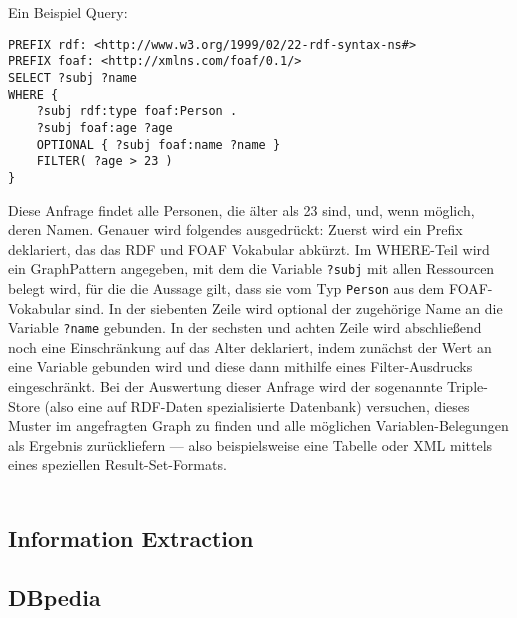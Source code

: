 Ein Beispiel Query:
\begin{lstlisting}[style=sparql]
PREFIX rdf: <http://www.w3.org/1999/02/22-rdf-syntax-ns#>
PREFIX foaf: <http://xmlns.com/foaf/0.1/>
SELECT ?subj ?name
WHERE {
    ?subj rdf:type foaf:Person .
    ?subj foaf:age ?age
    OPTIONAL { ?subj foaf:name ?name }
    FILTER( ?age > 23 )
}
\end{lstlisting}
Diese Anfrage findet alle Personen, die älter als 23 sind, und, wenn möglich, deren Namen. Genauer wird folgendes ausgedrückt: Zuerst wird ein Prefix deklariert, das das RDF und FOAF Vokabular abkürzt. Im WHERE-Teil wird ein GraphPattern angegeben, mit dem die Variable \texttt{?subj} mit allen Ressourcen belegt wird, für die die Aussage gilt, dass sie vom Typ \texttt{Person} aus dem FOAF-Vokabular sind. In der siebenten Zeile wird optional der zugehörige Name an die Variable \texttt{?name} gebunden. In der sechsten und achten Zeile wird abschließend noch eine Einschränkung auf das Alter deklariert, indem zunächst der Wert an eine Variable gebunden wird und diese dann mithilfe eines Filter-Ausdrucks eingeschränkt. Bei der Auswertung dieser Anfrage wird der sogenannte Triple-Store (also eine auf RDF-Daten spezialisierte Datenbank) versuchen, dieses Muster im angefragten Graph zu finden und alle möglichen Variablen-Belegungen als Ergebnis zurückliefern --- also beispielsweise eine Tabelle oder XML mittels eines speziellen Result-Set-Formats.\\
\\

\subsection{Information Extraction}

\subsection{DBpedia}

